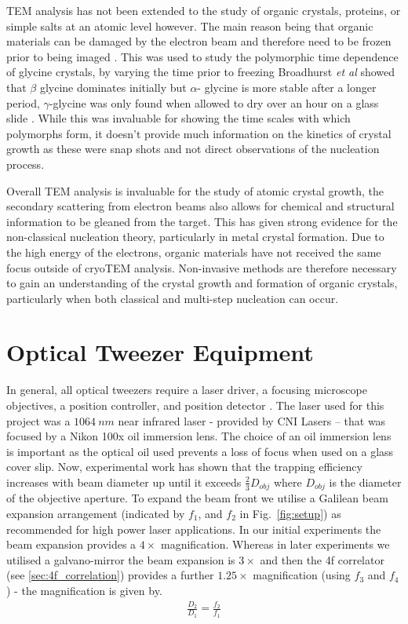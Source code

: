 TEM analysis has not been extended to the study of organic 
crystals, proteins, or simple salts at an atomic level 
however. The main reason being that organic materials can be 
damaged by the electron beam and therefore need to be frozen 
prior to being imaged \cite{Champness2020}. This was used to 
study the polymorphic time dependence of glycine crystals, by 
varying the time prior to freezing Broadhurst \textit{et al} 
showed that $\beta$ glycine dominates initially but $\alpha$-
glycine is more stable after a longer period, $\gamma$-glycine 
was only found when allowed to dry over an hour on a glass slide \cite{Broadhurst2020}. While this was invaluable for showing 
the time scales with which polymorphs form, it doesn't provide 
much information on the kinetics of crystal growth as these 
were snap shots and not direct observations of the nucleation 
process.

Overall TEM analysis is invaluable for the study of atomic 
crystal growth, the secondary scattering from electron 
beams also allows for chemical and structural information 
to be gleaned from the target. This has given strong evidence
for the non-classical nucleation theory, particularly in 
metal crystal formation. Due to the high energy of the 
electrons, organic materials have not received the same
focus outside of cryoTEM analysis. Non-invasive methods
are therefore necessary to gain an understanding of the
crystal growth and formation of organic crystals, 
particularly when both classical and multi-step nucleation 
can occur.

\section{Optical Tweezer Equipment}
In general, all optical tweezers require a laser driver, a focusing 
microscope objectives, a position controller, and position detector 
\cite{Gieseler2020}. The laser used for this project was a $1064\ 
nm$ near infrared laser - provided by CNI Lasers – that was focused 
by a Nikon 100x oil immersion lens. The choice of an oil immersion 
lens is important as the optical oil used prevents a loss of focus 
when used on a glass cover slip. Now, experimental work has shown 
that the trapping efficiency increases with beam diameter up until 
it exceeds $\frac{2}{3}D_{obj}$ \cite{kim2003dependence} where 
$D_{obj}$ is the diameter of the objective aperture. To expand the 
beam front we utilise a Galilean beam expansion arrangement 
(indicated by $f_1$, and $f_2$ in Fig.~\ref{fig:setup}) as recommended 
for high power laser applications. In our initial experiments the 
beam expansion provides a $4\times$ magnification. Whereas in later 
experiments we utilised a galvano-mirror the beam expansion is 
$3\times$ and then the 4f correlator (see \ref{sec:4f_correlation})
provides a further $1.25\times$ magnification (using $f_3$ and $f_4$) 
- the magnification is given by.
\begin{align}
	\frac{D_2}{D_1} = \frac{f_2}{f_1}
\end{align}

